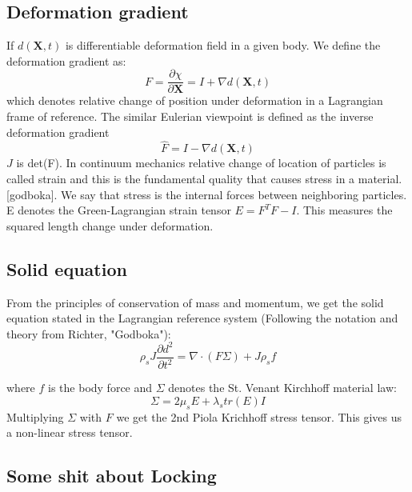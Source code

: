 \subsection*{Deformation gradient}

If $d(\textbf{X},t)$ is differentiable deformation field in a given body. We define the deformation gradient as:  
$$F = \frac{\partial \chi}{\partial \textbf{X}} = I + \nabla d(\textbf{X},t)$$ 
which denotes relative change of position under deformation in a Lagrangian frame of reference. The similar Eulerian viewpoint is defined as the inverse deformation gradient 
$$ \hat{F} = I - \nabla  d(\textbf{X},t)$$
$J$ is det(F).
In continuum mechanics relative change of location of particles is called strain and this is the fundamental quality that causes stress in a material. [godboka]. We say that stress is the internal forces between neighboring particles. E denotes the Green-Lagrangian strain tensor $ E = F^TF - I$. This measures the squared length change under deformation.

\subsection*{Solid equation}
From the principles of conservation of mass and momentum, we get the solid equation stated in the Lagrangian reference system (Following the notation and theory from Richter, "Godboka"):
\begin{equation}
\rho_s J \frac{\partial d^2}{\partial t^2} = \nabla \cdot ( F \Sigma ) + J\rho_s f 
\end{equation}

where $f$ is the body force and $\Sigma $ denotes the St. Venant Kirchhoff material law: 
$$ \Sigma = 2\mu_s E + \lambda_s tr(E) I $$ 
Multiplying $\Sigma $ with $F$ we get the 2nd Piola Krichhoff stress tensor. This gives us a non-linear stress tensor.

\subsection*{Some shit about Locking}




